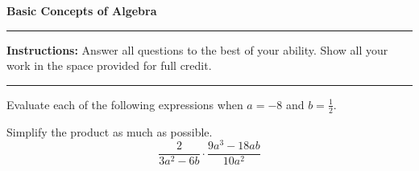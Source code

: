 \documentclass[12pt]{exam}
\newcommand{\examtitle}{Basic Concepts of Algebra}
\newcommand{\instructions}{
    \noindent\rule{\textwidth}{0.5pt}
    \begin{center}
    \textbf{Instructions:} Answer all questions to the best of your ability. Show all your work in the space provided for full credit.
    \end{center}
    \noindent\rule{\textwidth}{0.5pt}
}
\begin{document}
\begin{center}
\textbf{\Large \examtitle} \\
\vspace{0.5cm}
\hspace{0.1\textwidth}
\end{center}

\instructions
\vspace{0.5cm}

\begin{questions}


\pointsinrightmargin
\question[16]
Evaluate each of the following expressions when $a = -8$ and $b = \frac{1}{2}$.


\question[5]
Simplify the product as much as possible.
\[ \frac{2}{3a^2 - 6b} \cdot \frac{9a^3 - 18ab}{10a^2} \]
\fillwithdottedlines{4cm}



\end{questions}
\end{document}
